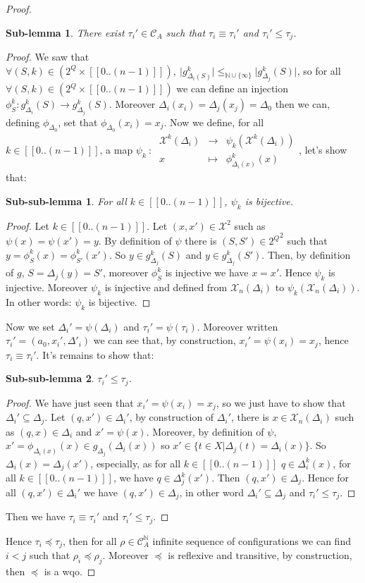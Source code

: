 \documentclass[a4paper,10pt]{report}
\newtheorem{slm}{Sub-lemma}[lm]
\newtheorem{sslm}{Sub-sub-lemma}[slm]
\newcommand{\dmap}[5]{
#1~:~\begin{array}{ccccc}
#2 &\to& #3 \\
#4  &\mapsto& #5
\end{array}}
\newcommand{\seg}[1]{[\![#1]\!]}
\newcommand{\ts}{\seg{0 .. (n-1)}}
\newcommand{\C}{\mathcal{C}_{A}}
\newcommand{\Xa}{\mathcal{X}}
\newcommand{\X}{\mathcal{X}_{n}}
\begin{document}
\begin {proof}
\begin{slm}
  There exist $\tau_i' \in \C$ such that $\tau_i \equiv \tau_i'$ and $\tau_i' \leq \tau_j$.
\end{slm}
\begin{proof}
We saw that $\forall (S,k) \in (2^Q \times \ts),\ \lvert g^k_{\Delta_i(S)} \lvert \leq_{\mathbb N \cup \{\infty\}} \lvert g^k_{\Delta_j}(S) \lvert$, 
so for all $\forall (S,k) \in (2^Q \times \ts)$ we can define an injection $\phi^k_S: g^k_{\Delta_i}(S) \to g^k_{\Delta_j}(S)$. 
Moreover $\Delta_i(x_i)=\Delta_j(x_j)=\Delta_0$ then we can, defining $\phi_{\Delta_0}$, set that $\phi_{\Delta_0}(x_i) = x_j$.
Now we define, for all $k \in \ts$, a map $\dmap{\psi_k}{\Xa^k(\Delta_i)}{\psi_k(\Xa^k(\Delta_i))}{x}{\phi^k_{\Delta_i(x)}(x)}$, let's show that:
\begin{sslm}
  For all $k \in \ts$, $\psi_k$ is bijective.
\end{sslm}
\begin{proof}
Let $k \in \ts$.
Let $(x,x') \in \Xa^2 $ such as $\psi(x)= \psi(x') = y$.
By definition of $\psi$ there is $(S,S')\in {2^Q}^2$ such that  $y = \phi_S^k(x) =\phi^k_{S'}(x')$. So $y\in g^k_{\Delta_j}(S)$ and  $y\in g^k_{\Delta_j}(S')$.
Then, by definition of $g$,
$S=\Delta_j(y)=S'$, moreover $\phi^k_S$ is injective we have $ x=x'$.
Hence  $\psi_k$ is injective.
Moreover $\psi_k$ is injective and defined from $\X(\Delta_i)$ to $\psi_k(\X(\Delta_i))$.
In other words: $\psi_k$ is bijective.
\end{proof}
Now we set $\Delta_i'=\psi (\Delta_i)$ and $\tau_i'=\psi (\tau_i)$. 
Moreover written $ \tau_i'=(a_0,x_i',\Delta'_i)$ we can see that, by construction, $ x_i'=\psi(x_i)=x_j$, hence $\tau_i \equiv \tau_i'$.
It's remains to show that:
\begin{sslm}
  $\tau_i' \leq \tau_j$.
\end{sslm}

\begin{proof}
  We have just seen that $ x_i'=\psi(x_i)=x_j$, so we just have to show that $\Delta_i' \subseteq \Delta_j$.
  Let $(q,x') \in \Delta_i'$, by construction of $\Delta_i'$, there is $x \in \X(\Delta_i)$ such as $(q,x) \in \Delta_i$ and $x'=\psi(x)$.
  Moreover, by definition of $\psi$, $x'=\phi_{\Delta_i(x)}(x) \in g_{\Delta_j}(\Delta_i(x))$ so $ x' \in \{ t \in X | \Delta_j(t)= \Delta_i(x) \}$.
  So $\Delta_i(x)=\Delta_j(x')$, especially, as for all $k \in \ts$ $q \in \Delta^k_i(x)$, for all $k \in \ts$, we have  $q \in \Delta^k_j(x')$.
  Then $(q,x') \in \Delta_j$.
  Hence for all $(q,x') \in \Delta_i'$ we have $(q,x') \in \Delta_j$, in other word $\Delta_i' \subseteq \Delta_j$ and $\tau_i' \leq \tau_j$.
\end{proof}
Then we have $\tau_i \equiv \tau_i'$ and  $\tau_i' \leq \tau_j$.
\end{proof}	
Hence $\tau_i \preceq \tau_j$, then for all $\rho \in \C^{\mathbb N}$ infinite sequence of configurations we can find $i < j$ such that $\rho_i \preceq \rho_j$.
Moreover $\preceq$ is reflexive and transitive, by construction, then $\preceq$ is a wqo.

\end{proof}
\end{document}
